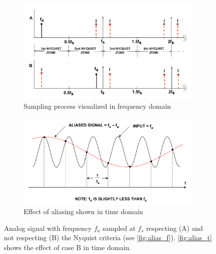 \begin{figure}[tbh]
	\centering
	\begin{subfigure}{\textwidth}
		\centering
		\includegraphics[width=\linewidth]{chap/02-theory/img/alias_f}  
		\caption{Sampling process visualized in frequency domain}
		\label{fig:alias_f}
	\end{subfigure}
	\begin{subfigure}{\textwidth}
		\centering
		\includegraphics[width=\linewidth]{chap/02-theory/img/alias_t}  
		\caption{Effect of aliasing shown in time domain}
		\label{fig:alias_t}
	\end{subfigure}
	\caption[Aliasing]{Analog signal with frequency $f_a$ sampled at $f_s$ respecting (A) and not respecting (B) the Nyquist criteria (see \autoref{fig:alias_f}). \autoref{fig:alias_t} shows the effect of case B in time domain. \cite{walt}}
	\label{fig:aliasing}
\end{figure}






